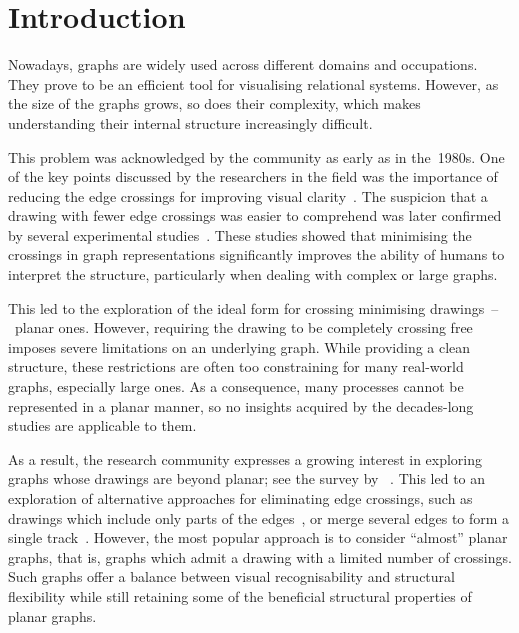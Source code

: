 \chapter{Introduction}\label{ch:introduction}

Nowadays, graphs are widely used across different domains and occupations. They prove to be an efficient tool for visualising relational systems. However, as the size of the graphs grows, so does their complexity, which makes understanding their internal structure increasingly difficult.

This problem was acknowledged by the community as early as in the~1980s. One of the key points discussed by the researchers in the field was the importance of reducing the edge crossings for improving visual clarity~\cite{early-few-crossing}. The suspicion that a drawing with fewer edge crossings was easier to comprehend was later confirmed by several experimental studies~\cite{graph-aesthetic-survey,graph-aesthetic-survey2}. These studies showed that minimising the crossings in graph representations significantly improves the ability of humans to interpret the structure, particularly when dealing with complex or large graphs.

This led to the exploration of the ideal form for crossing minimising drawings~--~planar ones. However, requiring the drawing to be completely crossing free imposes severe limitations on an underlying graph. While providing a clean structure, these restrictions are often too constraining for many real-world graphs, especially large ones. As a consequence, many processes cannot be represented in a planar manner, so no insights acquired by the decades-long studies are applicable to them.

As a result, the research community expresses a growing interest in exploring graphs whose drawings are beyond planar; see the survey by \citeauthor{beyond-planarity-survey}~\cite{beyond-planarity-survey}. This led to an exploration of alternative approaches for eliminating edge crossings, such as drawings which include only parts of the edges~\cite{break-the-edge,break-the-edge2}, or merge several edges to form a single track~\cite{confluent-drawings}. However, the most popular approach is to consider ``almost'' planar graphs, that is, graphs which admit a drawing with a limited number of crossings. Such graphs offer a balance between visual recognisability and structural flexibility while still retaining some of the beneficial structural properties of planar graphs.

